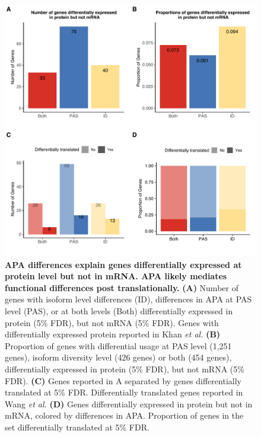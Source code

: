 \begin{figure}
\centering
\includegraphics[width=5in]{img/ch03/fig6.pdf}
\caption[APA differences explain genes differentially expressed at protein level but not in mRNA. APA likely mediates functional differences post translationally.]{\textbf{APA differences explain genes differentially expressed at protein level but not in mRNA. APA likely mediates functional differences post translationally.} \small {\bf (A)} Number of genes with isoform level differences (ID), differences in APA at PAS level (PAS), or at both levels (Both) differentially expressed in protein (5\% FDR), but not mRNA (5\% FDR). Genes with differentially expressed protein reported in Khan \emph{et al.} \citep{khan_primate_2013} {\bf (B)} Proportion of genes with differential usage at PAS level (1,251 genes), isoform diversity level (426 genes) or both (454 genes), differentially expressed in protein (5\% FDR), but not mRNA (5\% FDR). {\bf (C)} Genes reported in A separated by genes differentially translated at 5\% FDR. Differentially translated genes reported in Wang \emph{et al.}\citep{wang_post-translational_2018} {\bf (D) } Genes differentially expressed in protein but not in mRNA, colored by differences in APA. Proportion of genes in the set differentially translated at 5\% FDR.} 
\label{fig:Ch3fig6}
\end{figure}



